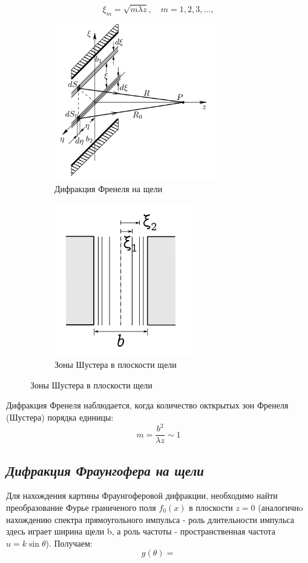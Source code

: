 \begin{equation}
\xi_m = \sqrt{m\lambda z}, \quad m = 1, 2, 3, \ldots, \label{eq:xi_m}
\end{equation}
\begin{figure}[h!]
    \centering
    \begin{subfigure}{0.48\linewidth}
        \centering
        \includegraphics[width=7cm]{images/A_theory.png}
        \caption{Дифракция Френеля на щели}
    \end{subfigure}
    \hfill
    \begin{subfigure}{0.5\linewidth}
        \centering
        \includegraphics[width=6cm]{images/shuster_zones.png}
        \caption{Зоны Шустера в плоскости щели}
    \end{subfigure}
\end{figure}

\indent Дифракция Френеля наблюдается, когда количество окткрытых зон Френеля (Шустера) порядка единицы:
\begin{equation}
    m = \frac{b^2}{\lambda z} \sim 1
\end{equation}

\subsection*{\textit{Дифракция Фраунгофера на щели}}
Для нахождения картины Фраунгоферовой дифракции, необходимо найти преобразование Фурье граниченого поля $f_0(x)$ в плоскости $z = 0$ (аналогичнo нахождению спектра прямоугольного импульса - роль длительности импульса здесь
играет ширина щели b, а роль частоты - пространственная частота $u = k \sin\theta$). Получаем:
\begin{equation}
    g(\theta) =\label{eq:fraunogofer}
\end{equation}


